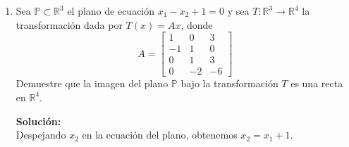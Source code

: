 \documentclass[12pt]{article}
\newenvironment{solucion}
{\begin{mdframed}[backgroundcolor=black!10]
		{\bf Solución:}\\
	}
	{
	\end{mdframed}
}
\newenvironment{preguntas}
{\begin{enumerate}\itemsep12pt
	}
	{
	\end{enumerate}
}
\newcommand{\ra}{\rightarrow}
\newcommand{\R}{\mathbb{R}}
\begin{document}
\begin{preguntas}
\begin{solucion}
$$\begin{bmatrix}
		0 \\ 1 \\ 0
		\end{bmatrix} = \begin{bmatrix}
		2 \\ 4
		\end{bmatrix}$$
		$$T\vec{d_2} = \begin{bmatrix}
		1 & 2 & -1\\
		2 & 4 & -2
		\end{bmatrix} \begin{bmatrix}
		-1 \\ 0 \\ 1
		\end{bmatrix} = \begin{bmatrix}
		-2 \\ -4
		\end{bmatrix}$$
		Tenemos que
		$$TP =  \begin{bmatrix}
		1 \\ 2
		\end{bmatrix} + \alpha  \begin{bmatrix}
		2 \\ 4
		\end{bmatrix} + 
		\beta  \begin{bmatrix}
		-2 \\ -4
		\end{bmatrix} =  \begin{bmatrix}
		1 + 2\alpha  - 2\beta \\
		2 + 4\alpha - 5\beta
		\end{bmatrix} = 
		(1+2\alpha - 2\beta)  \begin{bmatrix}
		1 \\ 2
		\end{bmatrix}$$
		En otras palabras, la imagen del plano por la traslación $T$ corresponde a los ponderados de $\begin{bmatrix}
			1 \\ 2
		\end{bmatrix}$, es decir
		$$T\vec{P} = Gen\left\{ \begin{bmatrix}
		1 \\ 2
		\end{bmatrix} \right\}$$
\end{solucion}
\item Sea $\mathbb{P} \subset \R^3$ el plano de ecuación $x_1-x_2+1=0$ y sea $T:\R^3 \ra \R^4$ la transformación dada por $T(x) = Ax$, donde
$$A = \begin{bmatrix}
1 & 0 & 3\\
-1 & 1 & 0 \\
0 & 1 & 3\\
0 & -2 & -6
\end{bmatrix}$$
Demuestre que la imagen del plano $\mathbb{P}$ bajo la transformación $T$ es una recta en $\R^4$.
\begin{solucion}
Despejando $x_2$ en la ecuación del plano, obtenemos $x_2 = x_1 + 1$.\\


\end{solucion}
\end{preguntas}
\end{document}
